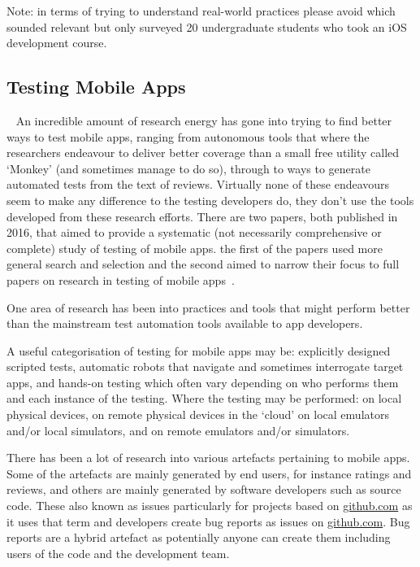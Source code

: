 Note: in terms of trying to understand real-world practices please avoid  which sounded relevant but only surveyed 20 undergraduate students who took an iOS development course. 


\subsection{Testing Mobile Apps}~\label{rw-testing-mobile-apps-topic}
An incredible amount of research energy has gone into trying to find better ways to test mobile apps, ranging from autonomous tools that where the researchers endeavour to deliver better coverage than a small free utility called `Monkey' (and sometimes manage to do so), through to ways to generate automated tests from the text of reviews. Virtually none of these endeavours seem to make any difference to the testing developers do, they don't use the tools developed from these research efforts. There are two papers, both published in 2016, that aimed to provide a systematic (not necessarily comprehensive or complete) study of testing of mobile apps. the first of the papers used more general search and selection   and the second aimed to narrow their focus to full papers on research in testing of mobile apps~. 

One area of research has been into practices and tools that might perform better than the mainstream test automation tools available to app developers.

A useful categorisation of testing for mobile apps may be: 
explicitly designed scripted tests, 
automatic robots that navigate and sometimes interrogate target apps, and 
hands-on testing which often vary depending on who performs them and each instance of the testing. 
Where the testing may be performed:
on local physical devices,
on remote physical devices in the `cloud'
on local emulators and/or local simulators, and
on remote emulators and/or simulators.

There has been a lot of research into various artefacts pertaining to mobile apps. Some of the artefacts are mainly generated by end users, for instance ratings and reviews, and others are mainly generated by software developers such as source code. These also known as issues particularly for projects based on \href{https://github.com/}{github.com} as it uses that term and developers create bug reports as issues on \href{https://github.com/}{github.com}. Bug reports are a hybrid artefact as potentially anyone can create them including users of the code and the development team. 


